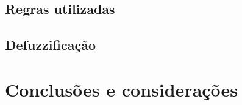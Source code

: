 \documentclass[twocolumn]{article}
\begin{document}
    \subsection{Regras utilizadas}

    \subsection{Defuzzificação}

    \section{Conclusões e considerações}

    
    
    \nocite{*}
\end{document}
